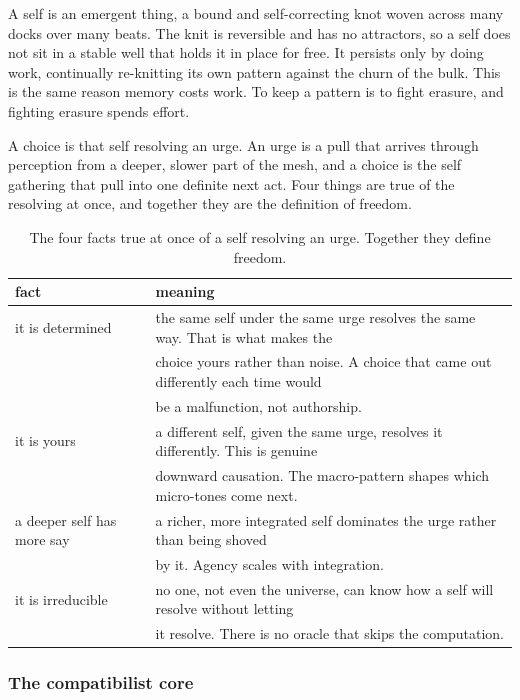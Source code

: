 A self is an emergent thing, a bound and self-correcting knot woven across many docks over many beats. The knit is reversible and has no attractors, so a self does not sit in a stable well that holds it in place for free. It persists only by doing work, continually re-knitting its own pattern against the churn of the bulk. This is the same reason memory costs work. To keep a pattern is to fight erasure, and fighting erasure spends effort.

A choice is that self resolving an urge. An urge is a pull that arrives through perception from a deeper, slower part of the mesh, and a choice is the self gathering that pull into one definite next act. Four things are true of the resolving at once, and together they are the definition of freedom.

\begin{table}[ht]
\centering
\begin{tabular}{@{}ll@{}}
\toprule
fact & meaning \\
\midrule
it is determined & the same self under the same urge resolves the same way. That is what makes the \\
 & choice yours rather than noise. A choice that came out differently each time would \\
 & be a malfunction, not authorship. \\
it is yours & a different self, given the same urge, resolves it differently. This is genuine \\
 & downward causation. The macro-pattern shapes which micro-tones come next. \\
a deeper self has more say & a richer, more integrated self dominates the urge rather than being shoved \\
 & by it. Agency scales with integration. \\
it is irreducible & no one, not even the universe, can know how a self will resolve without letting \\
 & it resolve. There is no oracle that skips the computation. \\
\bottomrule
\end{tabular}
\caption{The four facts true at once of a self resolving an urge. Together they define freedom.}
\label{tab:four-facts-freedom}
\end{table}

\subsubsection{The compatibilist core}

